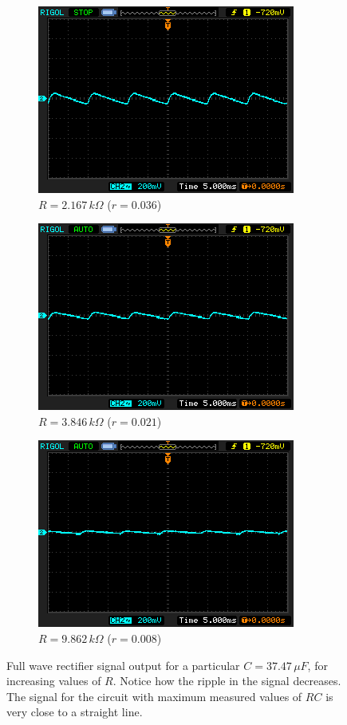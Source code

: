 \begin{figure}[H]

     \centering
     \begin{subfigure}{1\columnwidth}
        \centering
        \includegraphics[width=0.67\columnwidth]{images/31.png}
        \caption{$R =2.167\,k\Omega$ ($r=0.036$)}
    \end{subfigure}
    
    \begin{subfigure}{1\columnwidth}
        \centering
        \includegraphics[width=0.67\columnwidth]{images/32.png}
        \caption{$R =3.846\,k\Omega$ ($r=0.021$)}
    \end{subfigure}

    \begin{subfigure}{1\columnwidth}
        \centering
        \includegraphics[width=0.67\columnwidth]{images/33.png}
        \caption{$R =9.862\,k\Omega$ ($r=0.008$)}
    \end{subfigure}
    
    \caption{Full wave rectifier signal output for a particular $C = 37.47\,\mu F$, for increasing values of $R$. Notice how the ripple in the signal decreases. The signal for the circuit with maximum measured values of $RC$ is very close to a straight line.}
\end{figure}


